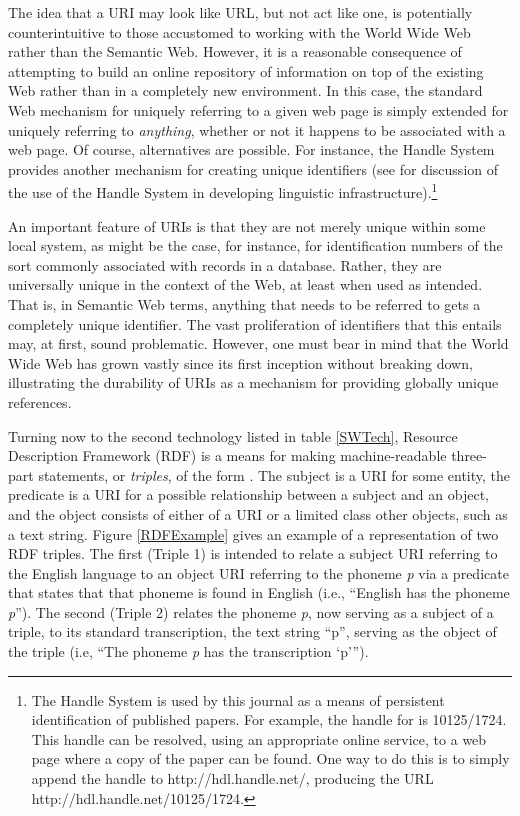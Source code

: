 \documentclass[12pt]{article}
\newcommand{\tref}[1]{table \ref{#1}}
\newcommand\namecite{\citet}
\begin{document}
The idea that a URI may look like URL, but not act like one, is potentially
counterintuitive to those accustomed to working with the World Wide Web rather
than the Semantic Web. However, it is a reasonable consequence of attempting to
build an online repository of information on top of the existing Web rather than
in a completely new environment. In this case, the standard Web mechanism for
uniquely referring to a given web page is simply extended for uniquely referring
to \emph{anything}, whether or not it happens to be associated with a web page.
Of course, alternatives are possible. For instance, the Handle System provides
another mechanism for creating unique identifiers (see
\namecite{BroederEtAl:2006} for discussion of the use of the Handle System in
developing linguistic infrastructure).{\footnote{The Handle System is used by
this journal as a means of persistent identification of published papers. For
example, the handle for \namecite{Newman:2007} is 10125/1724. This handle can be
resolved, using an appropriate online service, to a web page where a copy of the
paper can be found. One way to do this is to simply append the handle to
http://hdl.handle.net/, producing the URL http://hdl.handle.net/10125/1724.}}

An important feature of URIs is that they are not merely unique within some
local system, as might be the case, for instance, for identification numbers of
the sort commonly associated with records in a database. Rather, they are
universally unique in the context of the Web, at least when used as intended.
That is, in Semantic Web terms, anything that needs to be referred to gets a
completely unique identifier. The vast proliferation of identifiers that this
entails may, at first, sound problematic. However, one must bear in mind
that the World Wide Web has grown vastly since its first inception without
breaking down, illustrating the durability of URIs as a mechanism for
providing globally unique references.

Turning now to the second technology listed in \tref{SWTech}, Resource
Description Framework (RDF) is a means for making machine-readable three-part
statements, or \emph{triples}, of the form {}.
The subject is a URI for some entity, the predicate is a URI for a possible
relationship between a subject and an object, and the object consists of either
of a URI or a limited class other objects, such as a text string. Figure
\ref{RDFExample} gives an example of a representation of two RDF triples. The
first (Triple 1) is intended to relate a subject URI referring to the English
language to an object URI referring to the phoneme \emph{p} via a predicate that
states that that phoneme is found in English (i.e., ``English has the phoneme
\emph{p}''). The second (Triple 2) relates the phoneme \emph{p}, now serving as
a subject of a triple, to its standard transcription, the text string ``p'',
serving as the object of the triple (i.e, ``The phoneme \emph{p} has the
transcription `p''').
\end{document}
